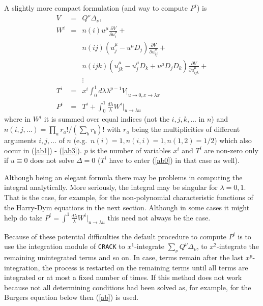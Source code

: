 A slightly more compact formulation (and way to compute $P^i$) is
\begin{eqnarray} 
V&=&Q^{\nu} \Delta_{\nu}, \nonumber \\
W^i
&=& n(i) u^{\mu} \frac{\partial V}{\partial u^{\mu}_i} +  \nonumber \\
& & n(ij) \left(u^{\mu}_j -u^{\mu}D_j\right) \frac{\partial V}{\partial u^{\mu}_{ij}} +  \nonumber \\
& & n(ijk) \left( u^{\mu}_{jk} - u^{\mu}_jD_k + u^{\mu}D_jD_k \right)
    \frac{\partial V}{\partial u^{\mu}_{ijk}} +  \nonumber \\     
& & \vdots  \nonumber \\
   T^i&=& x^i \int^1_0 d \lambda \lambda^{p-1} V|_{u\rightarrow 0, 
x\rightarrow \lambda x}  \nonumber \\
   P^i&=& T^i + \int^1_0 \frac{d \lambda}{\lambda} W^i|_{u\rightarrow \lambda u} 
\label{ab}
\end{eqnarray}
where in $W^i$ it is summed over equal indices (not the $i,j,k,\ldots$ in $n$) and 
$n(i,j,\ldots)=\prod_a r_a!/ (\sum_b r_b)! $ with $r_a$ being the multiplicities 
of different
arguments $i,j,\ldots$ of $n$ (e.g.\ $n(i)=1, n(i,i)=1, n(1,2)=1/2$)
which also occur in (\ref{ab1}) - (\ref{ab3}). 
$p$ is the number of variables $x^i$ and $T^i$ are non-zero only if
$u\equiv 0$ does not solve $\Delta=0$ ($T^i$ have to enter (\ref{ab0})
in that case as well).

Although being an elegant formula there may be problems in computing the
integral analytically. More seriously, the integral may be singular for
$\lambda=0,1$. That is the case, for example, for the non-polynomial
characteristic functions of the Harry-Dym equations in the next section.
Although in some cases it might help do take $P^i = \int^1 
\frac{d \lambda}{\lambda} W^i|_{u\rightarrow \lambda u}$ 
this need not always be the case.

Because of these potential difficulties
the default procedure to compute $P^i$ is to use
the integration module of {\tt CRACK} to
$x^1$-integrate $\sum_{\nu} Q^{\nu} \Delta_{\nu}$, to $x^2$-integrate
the remaining unintegrated terms and so on. In case, terms remain 
after the last $x^p$-integration, the process is restarted
on the remaining terms
until all terms are integrated or at most a fixed number of times.
If this method does not work because not all determining conditions had been
solved as, for example, for the Burgers equation
below then (\ref{ab}) is used.

